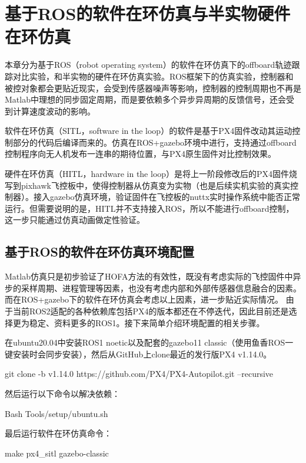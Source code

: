 \chapter{基于ROS的软件在环仿真与半实物硬件在环仿真}
本章分为基于ROS（robot operating system）的软件在环仿真下的offboard轨迹跟踪对比实验，和半实物的硬件在环仿真实验。ROS框架下的仿真实验，控制器和被控对象都会更贴近现实，会受到传感器噪声等影响，控制器的控制周期也不再是Matlab中理想的同步固定周期，而是要依赖多个异步异周期的反馈信号，还会受到计算速度波动的影响。

软件在环仿真（SITL，software in the loop）的软件是基于PX4固件改动其运动控制部分的代码后编译而来的。仿真在ROS+gazebo环境中进行，支持通过offboard控制程序向无人机发布一连串的期待位置，与PX4原生固件对比控制效果。

硬件在环仿真（HITL，hardware in the loop）是将上一阶段修改后的PX4固件烧写到pixhawk飞控板中，使得控制器从仿真变为实物（也是后续实机实验的真实控制器）。接入gazebo仿真环境，验证固件在飞控板的nuttx实时操作系统中能否正常运行。但需要说明的是，HITL并不支持接入ROS，所以不能进行offboard控制，这一步只能通过仿真动画做定性验证。

\section{基于ROS的软件在环仿真环境配置}
Matlab仿真只是初步验证了HOFA方法的有效性，既没有考虑实际的飞控固件中异步的采样周期、进程管理等因素，也没有考虑内部和外部传感器信息融合的因素。而在ROS+gazebo下的软件在环仿真会考虑以上因素，进一步贴近实际情况。
由于当前ROS2适配的各种依赖库包括PX4的版本都还在不停迭代，因此目前还是选择更为稳定、资料更多的ROS1。接下来简单介绍环境配置的相关步骤。

在ubuntu20.04中安装ROS1 noetic以及配套的gazebo11 classic（使用鱼香ROS一键安装\cite{fishros}时会同步安装），然后从GitHub上clone最近的发行版PX4 v1.14.0。
\begin{codeblock}[language=C]
  git clone -b v1.14.0 https://github.com/PX4/PX4-Autopilot.git --recursive
\end{codeblock}
然后运行以下命令以解决依赖：
\begin{codeblock}[language=C]
  Bash Tools/setup/ubuntu.sh
\end{codeblock}
最后运行软件在环仿真命令：
\begin{codeblock}[language=C]
  make px4_sitl gazebo-classic
\end{codeblock}

